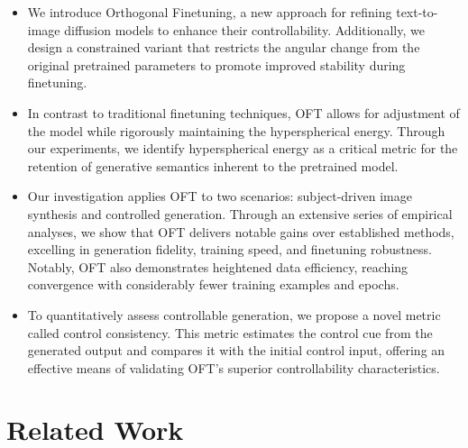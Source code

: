 \begin{itemize}[leftmargin=*,nosep]

    \item We introduce Orthogonal Finetuning, a new approach for refining text-to-image diffusion models to enhance their controllability. Additionally, we design a constrained variant that restricts the angular change from the original pretrained parameters to promote improved stability during finetuning.
    \item In contrast to traditional finetuning techniques, OFT allows for adjustment of the model while rigorously maintaining the hyperspherical energy. Through our experiments, we identify hyperspherical energy as a critical metric for the retention of generative semantics inherent to the pretrained model.
    \item Our investigation applies OFT to two scenarios: subject-driven image synthesis and controlled generation. Through an extensive series of empirical analyses, we show that OFT delivers notable gains over established methods, excelling in generation fidelity, training speed, and finetuning robustness. Notably, OFT also demonstrates heightened data efficiency, reaching convergence with considerably fewer training examples and epochs.
    \item To quantitatively assess controllable generation, we propose a novel metric called control consistency. This metric estimates the control cue from the generated output and compares it with the initial control input, offering an effective means of validating OFT’s superior controllability characteristics.
\end{itemize}

\section{Related Work}

